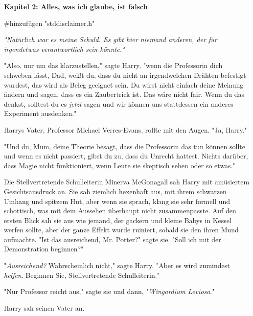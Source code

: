 

\hypertarget{alles-was-ich-glaube-ist-falsch}{%

\textbf{Kapitel 2: Alles, was ich glaube, ist falsch}

\#hinzufügen "stddisclaimer.h"

\later

\emph{"Natürlich war es meine Schuld. Es gibt hier niemand anderen, der für irgendetwas verantwortlich sein könnte."}

\later

"Also, nur um das klarzustellen," sagte Harry, "wenn die Professorin dich schweben lässt, Dad, weißt du, dass du nicht an irgendwelchen Drähten befestigt wurdest, das wird als Beleg geeignet sein. Du wirst nicht einfach deine Meinung ändern und sagen, dass es ein Zaubertrick ist. Das wäre nicht fair. Wenn du das denkst, solltest du es \emph{jetzt} sagen und wir können uns stattdessen ein anderes Experiment ausdenken."

Harrys Vater, Professor Michael Verres-Evans, rollte mit den Augen. "Ja, Harry."

"Und du, Mum, deine Theorie besagt, dass die Professorin das tun können sollte und wenn es nicht passiert, gibst du zu, dass du Unrecht hattest. Nichts darüber, dass Magie nicht funktioniert, wenn Leute sie skeptisch sehen oder so etwas."

Die Stellvertretende Schulleiterin Minerva McGonagall sah Harry mit amüsiertem Gesichtsausdruck an. Sie sah ziemlich hexenhaft aus, mit ihrem schwarzen Umhang und spitzem Hut, aber wenn sie sprach, klang sie sehr formell und schottisch, was mit dem Aussehen überhaupt nicht zusammenpasste. Auf den ersten Blick sah sie aus wie jemand, der gackern und kleine Babys in Kessel werfen sollte, aber der ganze Effekt wurde ruiniert, sobald sie den ihren Mund aufmachte. "Ist das ausreichend, Mr. Potter?" sagte sie. "Soll ich mit der Demonstration beginnen?"

"\emph{Ausreichend?} Wahrscheinlich nicht," sagte Harry. "Aber es wird zumindest \emph{helfen}. Beginnen Sie, Stellvertretende Schulleiterin."

"Nur Professor reicht aus," sagte sie und dann, "\emph{Wingardium Leviosa}."

Harry sah seinen Vater an.

}

